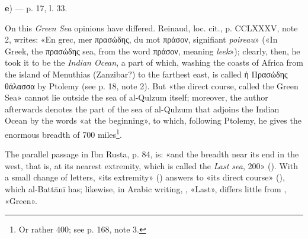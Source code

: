 \documentclass[11pt]{article}
\newcommand{\Pg}[1]{\marginpar{\footnotesize\color{gray}#1}}
\begin{document}
\par\begin{center}\textbf{e}) — p. 17, l. 33.\end{center}
\par \Pg{I 176}On this \emph{Green Sea} opinions have differed. Reinaud, loc. cit., p. CCLXXXV, note 2, writes: «En grec, mer {\greekfont πρασώδης}, du mot {\greekfont πράσον}, signifiant \emph{poireau}» («In Greek, the {\greekfont πρασώδης} sea, from the word {\greekfont πράσον}, meaning \emph{leek}»); clearly, then, he took it to be the \emph{Indian Ocean}, a part of which, washing the coasts of Africa from the island of Menuthias (Zanzibar?) to the farthest east, is called {\greekfont ἡ Πρασώδης θάλασσα} by Ptolemy (see p. 18, note 2). But «the direct course, called the Green Sea» cannot lie outside the sea of al-Qulzum itself; moreover, the author afterwards denotes the part of the sea of al-Qulzum that adjoins the Indian Ocean by the words «at the beginning», to which, following Ptolemy, he gives the enormous breadth of 700 miles\footnote{Or rather 400; see p. 168, note 3.}.\par
\par The parallel passage in Ibn Rusta, p. 84, is: «and the breadth near its end in the west, that is, at its nearest extremity, which is called the \emph{Last sea}, 200» (). With a small change of letters, «its extremity» () answers to «its direct course» (), which al-Battānī has; likewise, in Arabic writing, , «Last», differs little from , «Green».\par
\end{document}
